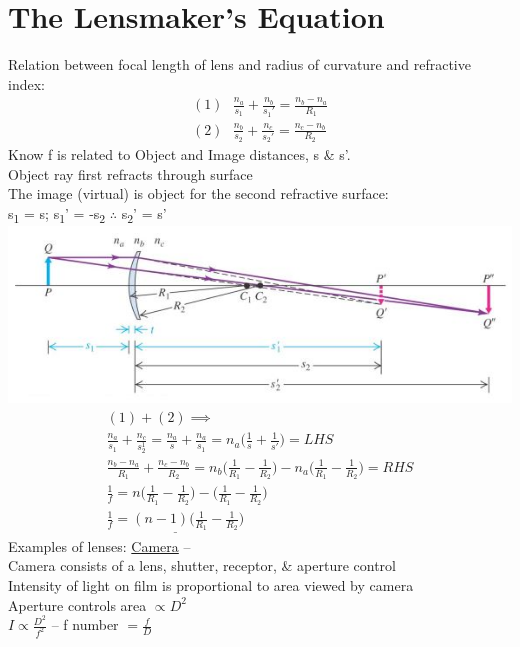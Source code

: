 \documentclass[a4paper, 11pt, fleqn, normalem]{report}
\begin{document}
\section{The Lensmaker's Equation}
Relation between focal length of lens and radius of curvature and refractive index:
\begin{gather*}
    (1)~~~\frac{n_{a}}{s_{1}} + \frac{n_{b}}{s_{1}'} = \frac{n_{b} - n_{a}}{R_{1}}\\
    (2)~~~\frac{n_{b}}{s_{2}} + \frac{n_{c}}{s_{2}'} = \frac{n_{c} - n_{b}}{R_{2}}
\end{gather*}
Know f is related to Object and Image distances, s \& s'. \\
Object ray first refracts through surface \\
The image (virtual) is object for the second refractive surface: \\ s\textsubscript{1} = s; s\textsubscript{1}' = -s\textsubscript{2} $\therefore$ s\textsubscript{2}' = s' \\
\includegraphics{Lensmaker.jpg}
\begin{gather*}
    (1) + (2) \implies \\
    \frac{n_{a}}{s_{1}} + \frac{n_{c}}{s_{2}^{1}} = \frac{n_{a}}{s} + \frac{n_{a}}{s_{1}} = n_{a}\Big(\frac{1}{s} + \frac{1}{s'}\Big) = LHS \\
    \frac{n_{b} - n_{a}}{R_{1}} + \frac{n_{c} - n_{b}}{R_{2}} = n_{b}\Big(\frac{1}{R_{1}} - \frac{1}{R_{2}}\Big) - n_{a}\Big(\frac{1}{R_{1}} - \frac{1}{R_{2}}\Big) = RHS \\
    \frac{1}{f} = n\Big(\frac{1}{R_{1}} - \frac{1}{R_{2}}\Big) - \Big(\frac{1}{R_{1}} - \frac{1}{R_{2}}\Big) \\
    \underline{\frac{1}{f} = (n - 1)\Big(\frac{1}{R_{1}} - \frac{1}{R_{2}}\Big)}
\end{gather*}
Examples of lenses: \underline{Camera} -- \\
Camera consists of a lens, shutter, receptor, \& aperture control \\
Intensity of light on film is proportional to area viewed by camera \\
Aperture controls area $\propto D^{2}$ \\
$I \propto \frac{D^{2}}{f^{2}}$ -- f number $= \frac{f}{D}$
\end{document}
